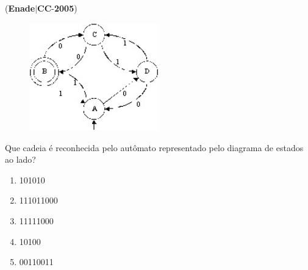 \documentclass{exam}
\begin{document}
\begin{questions}
\begin{enumerate}[label=\alph*)]
	\end{enumerate}

\question (\textbf{Enade}$|$\textbf{CC}-\textbf{2005}) \begin{figure}[H]
	\begin{center}
		\includegraphics[width=0.5\textwidth]{CIENCIA_DA_COMPUTACAO_Prova2005-utf8_figuras/fig-0042.jpg}
	\end{center}
\end{figure}
Que cadeia é reconhecida pelo
autômato representado pelo
diagrama de estados ao lado?
	\begin{enumerate}[label=\alph*)]
		\item  101010
		\item  111011000
		\item  11111000
		\item  10100
		\item  00110011

	\end{enumerate}


\end{questions}
\end{document}
